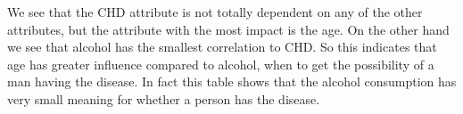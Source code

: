 We see that the CHD attribute is not totally dependent on any of the other attributes, but the attribute with the most impact is the age. On the other hand we see that alcohol has the smallest correlation to CHD. So this indicates that age has greater influence compared to alcohol, when to get the possibility of a man having the disease. In fact this table shows that the alcohol consumption has very small meaning for whether a person has the disease.